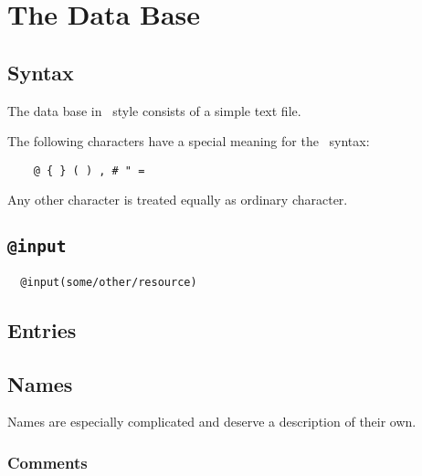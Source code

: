 
\chapter{The Data Base}


\section{Syntax}

The data base in \BibTeX\ style consists of a simple text file.

The following characters have a special meaning for the \BibTeX\
syntax:
\begin{verbatim}
    @ { } ( ) , # " =
\end{verbatim}
Any other character is treated equally as ordinary character.

\INCOMPLETE


\section{\texttt{@input}}

\begin{verbatim}
  @input(some/other/resource)
\end{verbatim}

\INCOMPLETE

\section{Entries}

\INCOMPLETE

\section{Names}\label{sec:names}
\IM{08x1}

Names are especially complicated and deserve a description of their
own.

\INCOMPLETE


\subsection{Comments}

